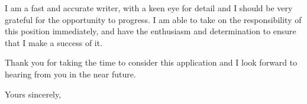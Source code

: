 \documentclass[letterpaper]{ReadableCV}
\begin{document}
I am a fast and accurate writer, with a keen eye for detail and I should be very grateful for the opportunity to progress. I am able to take on the responsibility of this position immediately, and have the enthusiasm and determination to ensure that I make a success of it.

Thank you for taking the time to consider this application and I look forward to hearing from you in the near future.

\bigskip

Yours sincerely, %

\end{document}
